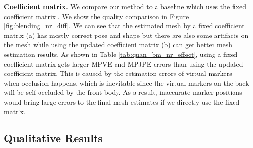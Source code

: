 \vspace{0.5em}
\noindent\textbf{Coefficient matrix.}
\label{subsubsec:blending_effect}
We compare our method to a baseline which uses the fixed coefficient matrix . 
We show the quality comparison in Figure \ref{fig:blending_nr_diff}. We can see that the estimated mesh by a fixed coefficient matrix (a) has mostly correct pose and shape but there are also some artifacts on the mesh while using the updated coefficient matrix (b) can get better mesh estimation results. 
As shown in Table \ref{tab:quan_bm_nr_effect}, using a fixed coefficient matrix gets larger MPVE and MPJPE errors than using the updated coefficient matrix. This is caused by the estimation errors of virtual markers when occlusion happens, which is inevitable since the virtual markers on the back will be self-occluded by the front body. As a result, inaccurate marker positions would bring large errors to the final mesh estimates if we directly use the fixed matrix.



\begin{table}[]
\center
\small
\setlength{\tabcolsep}{4pt}
\renewcommand\arraystretch{1.35}
\caption{Ablation study of the coefficient matrix for our approach on H3.6M dataset. ``fixed'' means using the fixed coefficient matrix  to reconstruct the mesh. 
}
\label{tab:quan_bm_nr_effect}
\end{table}












\subsection{Qualitative Results}


